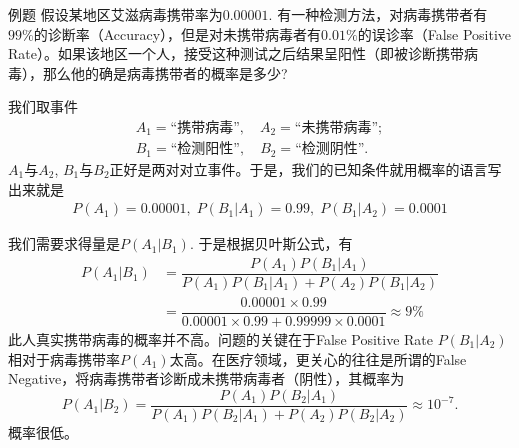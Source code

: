 
\begin{frame}

\begin{block}{例题}
假设某地区艾滋病毒携带率为$0.00001$. 有一种检测方法，对病毒携带者有$99\%$的诊断率（Accuracy），但是对未携带病毒者有$0.01\%$的误诊率（False Positive Rate）。如果该地区一个人，接受这种测试之后结果呈阳性（即被诊断携带病毒），那么他的确是病毒携带者的概率是多少?
\end{block}

\vspace{1em}
\pause

我们取事件
\begin{gather*}
A_1 = \text{``携带病毒''}, \quad A_2 = \text{``未携带病毒''}; \\
B_1 = \text{``检测阳性''}, \quad B_2 = \text{``检测阴性''}.
\end{gather*}
$A_1$与$A_2$, $B_1$与$B_2$正好是两对对立事件。于是，我们的已知条件就用概率的语言写出来就是
\begin{gather*}
P(A_1) = 0.00001,\; P(B_1|A_1) = 0.99,\; P(B_1|A_2) = 0.0001
\end{gather*}
\end{frame}


\begin{frame}

我们需要求得量是$P(A_1|B_1)$. 于是根据贝叶斯公式，有
\begin{align*}
P(A_1|B_1) & = \dfrac{P(A_1)P(B_1|A_1)}{P(A_1)P(B_1|A_1) + P(A_2)P(B_1|A_2)} \\
& = \dfrac{0.00001\times 0.99}{0.00001\times 0.99 + 0.99999\times 0.0001} \approx 9\%
\end{align*}
此人真实携带病毒的概率并不高。问题的关键在于False Positive Rate $P(B_1|A_2)$相对于病毒携带率$P(A_1)$太高。在医疗领域，更关心的往往是所谓的False Negative，将病毒携带者诊断成未携带病毒者（阴性），其概率为
\[P(A_1|B_2) = \dfrac{P(A_1)P(B_2|A_1)}{P(A_1)P(B_2|A_1) + P(A_2)P(B_2|A_2)} \approx 10^{-7}.\]
概率很低。

\end{frame}





